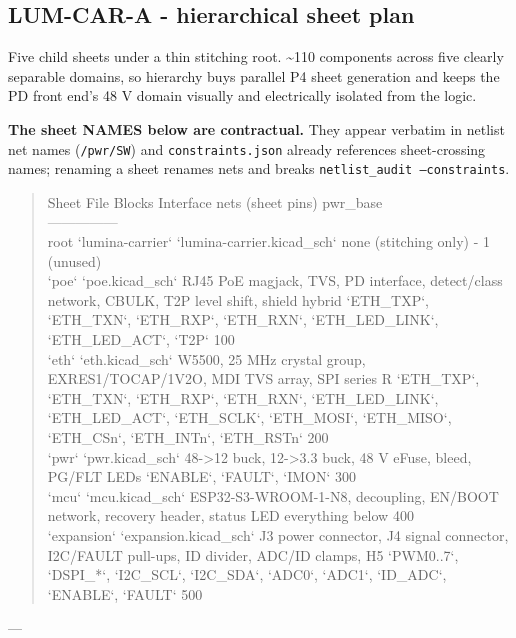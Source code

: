 \documentclass[11pt,a4paper]{article}
\begin{document}
\subsection*{LUM-CAR-A - hierarchical sheet plan}
Five child sheets under a thin stitching root. \textasciitilde{}110 components across five clearly separable domains, so hierarchy buys parallel P4 sheet generation and keeps the PD front end's 48 V domain visually and electrically isolated from the logic.

\textbf{The sheet NAMES below are contractual.} They appear verbatim in netlist net names (\texttt{/pwr/SW}) and \texttt{constraints.json} already references sheet-crossing names; renaming a sheet renames nets and breaks \texttt{netlist\_audit --constraints}.

\begin{quote}\small\ttfamily\raggedright
\textbar{} Sheet \textbar{} File \textbar{} Blocks \textbar{} Interface nets (sheet pins) \textbar{} pwr\_base \textbar{}\\
\textbar{}---\textbar{}---\textbar{}---\textbar{}---\textbar{}---\textbar{}\\
\textbar{} root `lumina-carrier` \textbar{} `lumina-carrier.kicad\_sch` \textbar{} none (stitching only) \textbar{} - \textbar{} 1 (unused) \textbar{}\\
\textbar{} `poe` \textbar{} `poe.kicad\_sch` \textbar{} RJ45 PoE magjack, TVS, PD interface, detect/class network, CBULK, T2P level shift, shield hybrid \textbar{} `ETH\_TXP`, `ETH\_TXN`, `ETH\_RXP`, `ETH\_RXN`, `ETH\_LED\_LINK`, `ETH\_LED\_ACT`, `T2P` \textbar{} 100 \textbar{}\\
\textbar{} `eth` \textbar{} `eth.kicad\_sch` \textbar{} W5500, 25 MHz crystal group, EXRES1/TOCAP/1V2O, MDI TVS array, SPI series R \textbar{} `ETH\_TXP`, `ETH\_TXN`, `ETH\_RXP`, `ETH\_RXN`, `ETH\_LED\_LINK`, `ETH\_LED\_ACT`, `ETH\_SCLK`, `ETH\_MOSI`, `ETH\_MISO`, `ETH\_CSn`, `ETH\_INTn`, `ETH\_RSTn` \textbar{} 200 \textbar{}\\
\textbar{} `pwr` \textbar{} `pwr.kicad\_sch` \textbar{} 48-\textgreater{}12 buck, 12-\textgreater{}3.3 buck, 48 V eFuse, bleed, PG/FLT LEDs \textbar{} `ENABLE`, `FAULT`, `IMON` \textbar{} 300 \textbar{}\\
\textbar{} `mcu` \textbar{} `mcu.kicad\_sch` \textbar{} ESP32-S3-WROOM-1-N8, decoupling, EN/BOOT network, recovery header, status LED \textbar{} everything below \textbar{} 400 \textbar{}\\
\textbar{} `expansion` \textbar{} `expansion.kicad\_sch` \textbar{} J3 power connector, J4 signal connector, I2C/FAULT pull-ups, ID divider, ADC/ID clamps, H5 \textbar{} `PWM0..7`, `DSPI\_{*}`, `I2C\_SCL`, `I2C\_SDA`, `ADC0`, `ADC1`, `ID\_ADC`, `ENABLE`, `FAULT` \textbar{} 500 \textbar{}
\end{quote}
---
\end{document}
